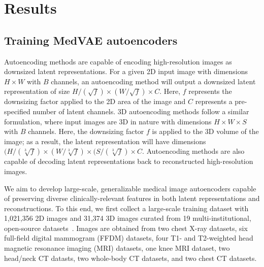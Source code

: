 \section{Results}
\subsection{Training MedVAE autoencoders}

Autoencoding methods are capable of encoding high-resolution images as downsized latent representations. For a given 2D input image with dimensions $H \times W$ with $B$ channels, an autoencoding method will output a downsized latent representation of size $H/(\sqrt{f}) \times (W/\sqrt{f}) \times C$. Here, $f$ represents the downsizing factor applied to the 2D area of the image and $C$ represents a pre-specified number of latent channels. 3D autoencoding methods follow a similar formulation, where input images are 3D in nature with dimensions $H \times W \times S$ with $B$ channels. Here, the downsizing factor $f$ is applied to the 3D volume of the image; as a result, the latent representation will have dimensions $(H/(\sqrt[3]{f}) \times (W/\sqrt[3]{f}) \times (S/(\sqrt[3]{f}) \times C$. Autoencoding methods are also capable of decoding latent representations back to reconstructed high-resolution images. 

We aim to develop large-scale, generalizable medical image autoencoders capable of preserving diverse clinically-relevant features in both latent representations and reconstructions. To this end, we first collect a large-scale training dataset with 1,021,356 2D images and 31,374 3D images curated from 19 multi-institutional, open-source datasets~\cite{johnson2019mimic,feng2021candid,jeong2022emory,sorkhei2021csaw,rsnamammo,nguyen2022vindrmammo,moreira2012inbreast,cai2023online,jack2008alzheimer,dagley2017harvard,insel2020a4,lamontagne2019oasis,bien2018deep,hooper2021impact,chilamkurthy2018development,wasserthal2023totalsegmentator,ji2022amos,armato2011lung,stanfordaimi_coca_2024}. Images are obtained from two chest X-ray datasets, six full-field digital mammogram (FFDM) datasets, four T1- and T2-weighted head magnetic resonance imaging (MRI) datasets, one knee MRI dataset, two head/neck CT datasts, two whole-body CT datasets, and two chest CT datasets.

